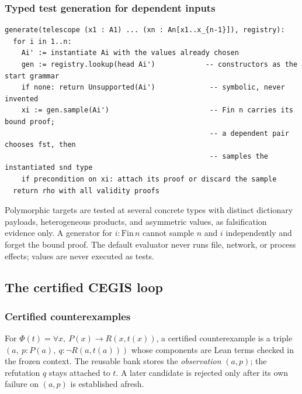 \subsubsection{Typed test generation for dependent inputs}

\begin{lstlisting}
generate(telescope (x1 : A1) ... (xn : An[x1..x_{n-1}]), registry):
  for i in 1..n:
    Ai' := instantiate Ai with the values already chosen
    gen := registry.lookup(head Ai')            -- constructors as the start grammar
    if none: return Unsupported(Ai')             -- symbolic, never invented
    xi := gen.sample(Ai')                        -- Fin n carries its bound proof;
                                                 -- a dependent pair chooses fst, then
                                                 -- samples the instantiated snd type
    if precondition on xi: attach its proof or discard the sample
  return rho with all validity proofs
\end{lstlisting}
Polymorphic targets are tested at several concrete types with distinct dictionary payloads, heterogeneous products, and asymmetric values, as falsification evidence only. A generator for $i:\mathrm{Fin}\,n$ cannot sample $n$ and $i$ independently and forget the bound proof. The default evaluator never runs file, network, or process effects;  values are never executed as tests.

\subsection{The certified CEGIS loop}

\subsubsection{Certified counterexamples}

\begin{definition}
For $\Phi(t)=\forall x,\ P(x)\to R(x,t(x))$, a certified counterexample is a triple $(a,\ p:P(a),\ q:\neg R(a,t(a)))$ whose components are Lean terms checked in the frozen context. The reusable bank stores the \emph{observation} $(a,p)$; the refutation $q$ stays attached to $t$. A later candidate is rejected only after its own failure on $(a,p)$ is established afresh.
\end{definition}


